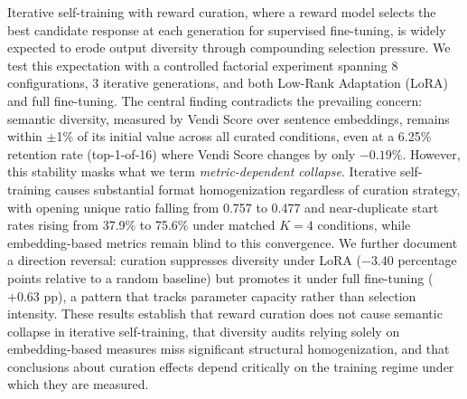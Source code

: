 Iterative self-training with reward curation, where a reward model selects the best candidate response at each generation for supervised fine-tuning, is widely expected to erode output diversity through compounding selection pressure. We test this expectation with a controlled factorial experiment spanning 8 configurations, 3 iterative generations, and both Low-Rank Adaptation (LoRA) and full fine-tuning. The central finding contradicts the prevailing concern: semantic diversity, measured by Vendi Score over sentence embeddings, remains within $\pm$1\% of its initial value across all curated conditions, even at a 6.25\% retention rate (top-1-of-16) where Vendi Score changes by only $-0.19\%$. However, this stability masks what we term \emph{metric-dependent collapse}. Iterative self-training causes substantial format homogenization regardless of curation strategy, with opening unique ratio falling from 0.757 to 0.477 and near-duplicate start rates rising from 37.9\% to 75.6\% under matched $K{=}4$ conditions, while embedding-based metrics remain blind to this convergence. We further document a direction reversal: curation suppresses diversity under LoRA ($-3.40$ percentage points relative to a random baseline) but promotes it under full fine-tuning ($+0.63$ pp), a pattern that tracks parameter capacity rather than selection intensity. These results establish that reward curation does not cause semantic collapse in iterative self-training, that diversity audits relying solely on embedding-based measures miss significant structural homogenization, and that conclusions about curation effects depend critically on the training regime under which they are measured.